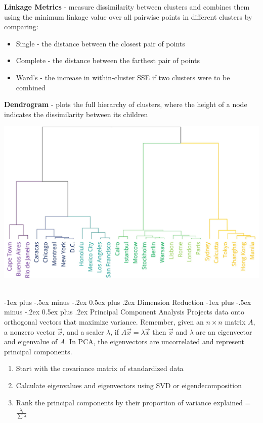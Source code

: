 \documentclass[10pt,landscape]{article}
\makeatletter
\renewcommand{\section}{\@startsection{section}{1}{0mm}%
                                {-1ex plus -.5ex minus -.2ex}%
                                {0.5ex plus .2ex}%
                                {\normalfont\large\bfseries}}
\renewcommand{\subsection}{\@startsection{subsection}{2}{0mm}%
                                {-1ex plus -.5ex minus -.2ex}%
                                {0.5ex plus .2ex}%
                                {\normalfont\normalsize\bfseries}}
\makeatother
\begin{document}
\begin{multicols}{3}
\textbf{Linkage Metrics} - measure dissimilarity between clusters and combines them using the minimum linkage value over all pairwise points in different clusters by comparing:
\begin{itemize}[label={--},leftmargin=4mm]
\itemsep -.4mm 
\item Single - the distance between the closest pair of points
\item Complete - the distance between the farthest pair of points
\item Ward's - the increase in within-cluster SSE if two clusters were to be combined 
\end{itemize}
\textbf{Dendrogram} - plots the full hierarchy of clusters, where the height of a node indicates the dissimilarity between its children 
\begin{center}
    \includegraphics[scale = .1]{images/dendroedit3.JPG}
\end{center}

\columnbreak
\textcolor{white}{.}\vspace{-5mm}\\ %
\section{Dimension Reduction}
\subsection{Principal Component Analysis}
Projects data onto orthogonal vectors that maximize variance.
Remember, given an $n\times n$ matrix $A$, a nonzero vector $\vec{x}$, and a scaler $\lambda$, if $A\vec{x} = \lambda \vec{x}$ then $\vec{x}$ and $\lambda$ are an eigenvector and eigenvalue of $A$. In PCA, the eigenvectors are uncorrelated and represent principal components.
\begin{enumerate}[leftmargin=5mm]
\itemsep -.4mm 
\item Start with the covariance matrix of standardized data
\item Calculate eigenvalues and eigenvectors using SVD or eigendecomposition
\item Rank the principal components by their proportion of variance explained = $\frac{\lambda_i}{\sum{\lambda}}$
\end{enumerate}


\end{multicols}
\end{document}
